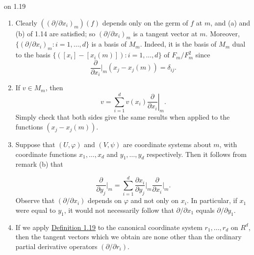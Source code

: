 \begin{remarks}{on 1.19}\label{thm:1.20}
	\begin{enumerate}
		\item[(a)] Clearly  $  ((\partial/\partial x_i)_m)(f)  $ depends only on the germ of  $  f  $ at  $  m  $, and (a) and (b) of 1.14 are satisfied; so  $  (\partial/\partial x_i)_m  $ is a tangent vector at  $  m  $. Moreover,  $  \{(\partial/\partial x_i)_m : i = 1, \ldots, d\}  $ is a basis of  $  M_m  $. Indeed, it is the basis of  $  M_m  $ dual to the basis  $  \{([x_i] - [x_i(m)]) : i = 1, \ldots, d\}  $ of  $  F_m/F_m^2  $ since
		      \[
			      \frac{\partial}{\partial x_{i}}\bigg|_{m}(x_{j}-x_{j}(m))=\delta_{ij}.
		      \]

		\item[(b)] If  $ v \in M_{m} $, then
		      \[
			      v=\sum_{i=1}^{d}v(x_{i})\left.\frac{\partial}{\partial x_{i}}\right|_{m}.
		      \]
		      Simply check that both sides give the same results when applied to the functions $(x_{j}-x_{j}(m))$.

		\item[(c)] Suppose that $(U,\varphi)$ and $(V,\psi)$ are coordinate systems about $m$, with coordinate functions $x_{1},\ldots,x_{d}$ and $y_{1},\ldots,y_{d}$ respectively. Then it follows from remark (b) that

		      \[
			      \frac{\partial}{\partial y_{j}}\Big|_{m}=\sum_{i=1}^{d}\frac{\partial x_{i}}{\partial y_{j}}\Big|_{m}\frac{\partial}{\partial x_{i}}\Big|_{m}.
		      \]
		      Observe that $(\partial/\partial x_{i})$ depends on $\varphi$ and not only on $x_{i}$. In particular, if $x_{1}$ were equal to $y_{1}$, it would not necessarily follow that $\partial/\partial x_{1}$ equals $\partial/\partial y_{1}$.

		\item[(d)] If we apply \hyperref[thm:1.19]{Definition 1.19} to the canonical coordinate system  $ r_{1}, \ldots, r_{d} $ on  $ R^{d} $, then the tangent vectors which we obtain are none other than the ordinary partial derivative operators  $ (\partial/\partial r_{i}) $.
	\end{enumerate}
\end{remarks}

